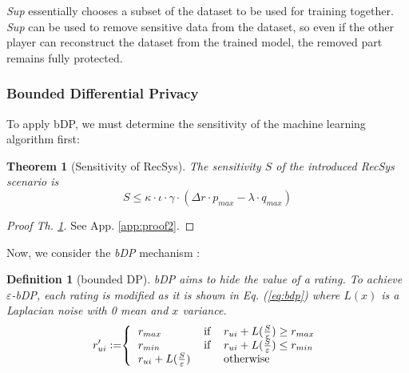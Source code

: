 \documentclass[USenglish,oneside,twocolumn]{article}
\theoremstyle{plain}
\newtheorem{theorem}{Theorem}
\newtheorem{definition}{Definition}
\begin{document}
    \textit{Sup} essentially chooses a subset of the dataset to be used for training together. \textit{Sup} can be used to remove sensitive data from the dataset, so even if the other player can reconstruct the dataset from the trained model, the removed part remains fully protected.
    
    \vspace{-0.5cm}
    \subsubsection{Bounded Differential Privacy}
    \vspace{-0.25cm}
    
    To apply bDP, we must determine the sensitivity of the machine learning algorithm first:
    
    \vspace{-0.25cm}
    \begin{theorem}[Sensitivity of RecSys]
        \label{th:sens}
        The sensitivity $S$ of the introduced RecSys scenario is
        \vspace{-0.1cm}
        \begin{equation}
        \label{eq:sgd}
        S\leq\kappa\cdot\iota\cdot \gamma \cdot (\Delta r \cdot p_{max} -\lambda \cdot q_{max})
        \end{equation}
    \end{theorem}
    \vspace{-0.5cm}
    \begin{proof}[Proof Th. \ref{th:sens}]
        See App. \ref{app:proof2}.
    \end{proof}
    \vspace{-0.1cm}
    
    Now, we consider the \textit{bDP} mechanism \cite{friedman2016differential}:
    
    \vspace{-0.25cm}
    \begin{definition}[bounded DP]
        bDP aims to hide the value of a rating. To achieve $\varepsilon$-bDP, each rating is modified as it is shown in Eq. (\ref{eq:bdp}) where $L(x)$ is a Laplacian noise with 0 mean and $x$ variance.
        \vspace{-0.1cm}
        \begin{equation}
        \label{eq:bdp}
        r'_{ui}:=\hspace{-0.1cm}\left\{
        \begin{tabular}{lll}
        $r_{max}$ & if & $r_{ui}+L(\frac{S}{\varepsilon})\geq r_{max}$\\
        $r_{min}$ & if & $r_{ui}+L(\frac{S}{\varepsilon})\leq r_{min}$\\
        $r_{ui}+L(\frac{S}{\varepsilon})$ & & otherwise\\
        \end{tabular}\right.
        \end{equation}
    \end{definition}
    \vspace{-0.25cm}
    
\end{document}
